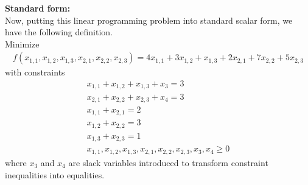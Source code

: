 \documentclass[11pt]{article}
\begin{document}
\begin{sol}
\textbf{Standard form:} \\
Now, putting this linear programming problem into standard scalar form, we have the following definition. \\

Minimize 
\begin{eqnarray*}
f(x_{1,1},x_{1,2},x_{1,3},x_{2,1},x_{2,2},x_{2,3}) = 4x_{1,1} + 3x_{1,2} + x_{1,3} + 2x_{2,1} + 7x_{2,2} + 5x_{2,3}
\end{eqnarray*}
with constraints 
\begin{eqnarray*}
x_{1,1} + x_{1,2} + x_{1,3} + x_{3} = 3 \\
x_{2,1} + x_{2,2} + x_{2,3} + x_{4} = 3 \\
x_{1,1} + x_{2,1} = 2 \\
x_{1,2} + x_{2,2} = 3 \\
x_{1,3} + x_{2,3} = 1 \\
x_{1,1}, x_{1,2}, x_{1,3}, x_{2,1}, x_{2,2}, x_{2,3}, x_{3}, x_{4} \geq 0 
\end{eqnarray*}
where $x_{3}$ and $x_{4}$ are slack variables introduced to transform constraint inequalities into equalities.
\end{sol}
\end{document}
